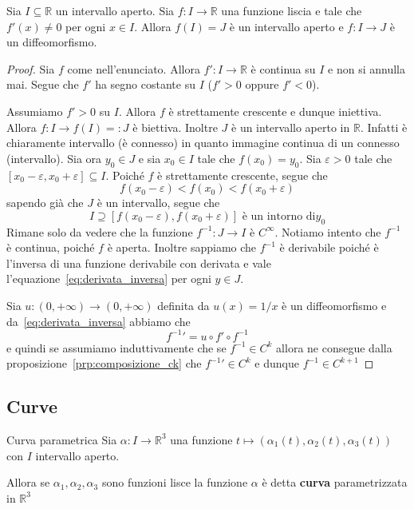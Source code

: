\begin{lemma}
    Sia \(I \subseteq \mathbb{R}\) un intervallo aperto. Sia \(f : I \to
    \mathbb{R}\) una funzione liscia e tale che \(f'{(x)} \neq 0\) per ogni \(x
    \in I\). Allora \(f{(I)} = J\) è un intervallo aperto e \(f : I \to J\) è un
    diffeomorfismo.
\end{lemma}
\begin{proof}
    Sia \(f\) come nell'enunciato. Allora \(f' : I \to \mathbb{R}\) è continua
    su \(I\) e non si annulla mai. Segue che \(f'\) ha segno costante su \(I\)
    (\(f' > 0\) oppure \(f' < 0\)).

    Assumiamo \(f' > 0\) su \(I\). Allora \(f\) è strettamente crescente e
    dunque iniettiva. Allora \(f : I \to f{(I)} =: J\) è biettiva. Inoltre \(J\)
    è un intervallo aperto in \(\mathbb{R}\). Infatti è chiaramente intervallo
    (è connesso) in quanto immagine continua di un connesso (intervallo).  Sia
    ora \(y_{0} \in J\) e sia \(x_{0} \in I\) tale che \(f{(x_{0})} = y_{0}\).
    Sia \(\varepsilon > 0\) tale che \([x_{0} - \varepsilon, x_{0} +
    \varepsilon] \subseteq I \). Poiché \(f\) è strettamente crescente, segue
    che 
    \[
        f{(x_{0}-\varepsilon)} < f{(x_{0})} < f{(x_{0}+\varepsilon)}
    \]
    sapendo già che \(J\) è un intervallo, segue che \[I\supseteq
    [f{(x_{0}-\varepsilon)}, f{(x_{0} + \varepsilon)}] \text{ è un intorno di
\(y_{0}\)}\]
    Rimane solo da vedere che la funzione \(f^{-1} : J \to I\) è
    \(C^{\infty}\). Notiamo intento che \(f^{-1}\) è continua, poiché \(f\) è aperta.
    Inoltre sappiamo che \(f^{-1}\) è derivabile poiché è l'inversa di una
    funzione derivabile con derivata e vale
    l'equazione~\eqref{eq:derivata_inversa} per ogni \(y \in J\).

    Sia \(u : {(0, +\infty)} \to {(0, +\infty)}\) definita da \(u{(x)} = 1/x\) è
    un diffeomorfismo e da~\ref{eq:derivata_inversa} abbiamo che
    \[
        {f^{-1}}' = u \circ f' \circ f^{-1}
    \]
    e quindi se assumiamo induttivamente che se \(f^{-1} \in C^{k}\) allora ne
    consegue dalla proposizione~\ref{prp:composizione_ck} che \({f^{-1}}' \in
    C^{k}\) e dunque \(f^{-1} \in C^{k+1}\) 

\end{proof}

\subsection{Curve}
\begin{definition}{Curva parametrica}
    Sia \(\alpha : I \to \mathbb{R}^{3}\) una funzione 
    \(t \mapsto (\alpha_{1}(t), \alpha_{2}(t), \alpha_{3}(t)) \) con \(I\)
    intervallo aperto.
    
    Allora se \(\alpha_{1}, \alpha_{2}, \alpha_{3}\) sono funzioni lisce la
    funzione \(\alpha\) è detta \textbf{curva} parametrizzata in \(\mathbb{R}^3\) 
\end{definition}


